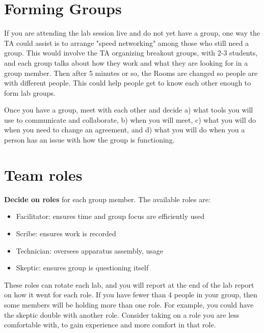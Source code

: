 \section{Forming Groups}

If you are attending the lab session live and do not yet have a group, one way the TA could assist is to arrange "speed networking" among those who still need a group. This would involve the TA organizing breakout groups, with 2-3 students, and each group talks about how they work and what they are looking for in a group member. Then after 5 minutes or so, the Rooms are changed so people are with different people. This could help people get to know each other enough to form lab groups.

\begin{steps}
	\item Once you have a group, meet with each other and decide a) what tools you will use to communicate and collaborate, b) when you will meet, c) what you will do when you need to change an agreement, and d) what you will do when you a person has an issue with how the group is functioning.
\end{steps}

\section{Team roles}

\textbf{Decide on roles} for each group member. The available roles are:

\begin{itemize}
	\item Facilitator: ensures time and group focus are efficiently used
	\item Scribe: ensures work is recorded
	\item Technician: oversees apparatus assembly, usage
	\item Skeptic: ensures group is questioning itself
\end{itemize}

These roles can rotate each lab, and you will report at the end of the lab report on how it went for each role. If you have fewer than 4 people in your group, then some members will be holding more than one role. For example, you could have the skeptic double with another role. Consider taking on a role you are less comfortable with, to gain experience and more comfort in that role.

